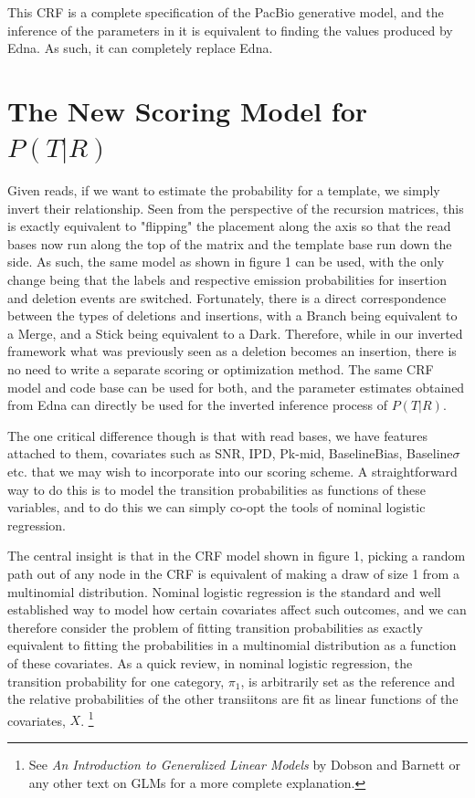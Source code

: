 \documentclass[fleqn,10pt]{SelfArx} %
\begin{document}
This CRF is a complete specification of the PacBio generative model, and the inference of the parameters in it is equivalent to finding the values produced by Edna.  As such, it can completely replace Edna.


\section{The New Scoring Model for $P(T|R)$ }

Given reads, if we want to estimate the probability for a template, we simply invert their relationship.  Seen from the perspective of the recursion matrices, this is exactly equivalent to "flipping" the placement along the axis so that the read bases now run along the top of the matrix and the template base run down the side.  As such, the same model as shown in figure 1 can be used, with the only change being that the labels and respective emission probabilities for insertion and deletion events are switched.  Fortunately, there is a direct correspondence between the types of deletions and insertions, with a Branch being equivalent to a Merge, and a Stick being equivalent to a Dark.  Therefore, while in our inverted framework what was previously seen as a deletion becomes an insertion, there is no need to write a separate scoring or optimization method.  The same CRF model and code base can be used for both, and the parameter estimates obtained from Edna can directly be used for the inverted inference process of $P(T|R)$.

The one critical difference though is that with read bases, we have features attached to them, covariates such as SNR, IPD, Pk-mid, BaselineBias, Baseline$\sigma$  etc. that we may wish to incorporate into our scoring scheme.  A straightforward way to do this is to model the transition probabilities as functions of these variables, and to do this we can simply co-opt the tools of nominal logistic regression.

The central insight is that in the CRF model shown in figure 1, picking a random path out of any node in the CRF is equivalent of making a draw of size 1 from a multinomial distribution.  Nominal logistic regression is the standard and well established way to model how certain covariates affect such outcomes, and we can therefore consider the problem of fitting transition probabilities as exactly equivalent to fitting the probabilities in a multinomial distribution as a function of these covariates.  As a quick review, in nominal logistic regression, the transition probability for one category, $\pi_{1}$, is arbitrarily set as the reference and the relative probabilities of the other transiitons are fit as linear functions of the covariates, $X$. \footnote{See \textit{An Introduction to Generalized Linear Models} by Dobson and Barnett or any other text on GLMs for a more complete explanation.}
\end{document}
